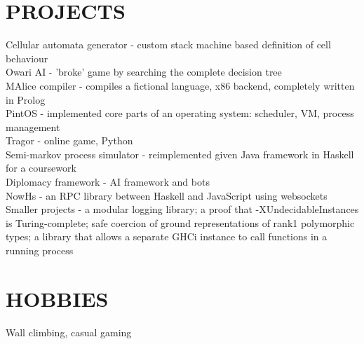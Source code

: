 \documentclass[11pt]{res} %
\begin{document}
\begin{resume}
\section{PROJECTS}
Cellular automata generator - custom stack machine based definition of cell behaviour\\
Owari AI - 'broke' game by searching the complete decision tree\\
MAlice compiler - compiles a fictional language, x86 backend, completely written in Prolog\\
PintOS - implemented core parts of an operating system: scheduler, VM, process management\\
Tragor - online game, Python\\
Semi-markov process simulator - reimplemented given Java framework in Haskell for a coursework\\
Diplomacy framework - AI framework and bots\\
NowHs - an RPC library between Haskell and JavaScript using websockets\\
Smaller projects - a modular logging library; a proof that -XUndecidableInstances is Turing-complete; safe coercion of ground representations of rank1 polymorphic types; a library that allows a separate GHCi instance to call functions in a running process
 
\section{HOBBIES} 
 
Wall climbing, casual gaming

\end{resume}



\end{document}
